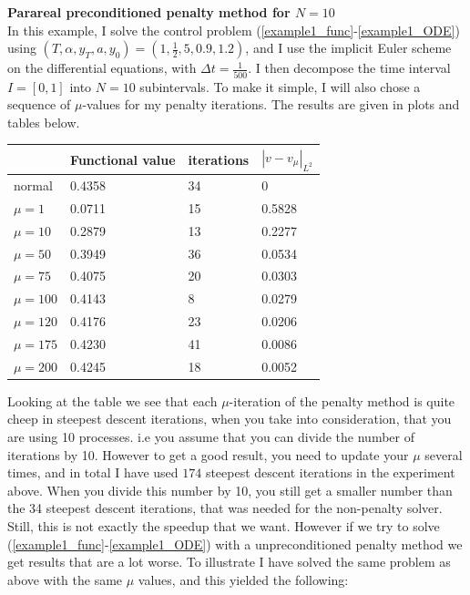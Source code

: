 \documentclass[11pt,a4paper]{article}
\begin{document}
\\
\\
\textbf{Parareal preconditioned penalty method for $N=10$}
\\
In this example, I solve the control problem (\ref{example1_func}-\ref{example1_ODE}) using $(T,\alpha,y_T,a,y_0)=(1,\frac{1}{2},5,0.9,1.2)$, and I use the implicit Euler scheme on the differential equations, with $\Delta t=\frac{1}{500}$. I then decompose the time interval $I=[0,1]$ into $N=10$ subintervals. To make it simple, I will also chose a sequence of $\mu$-values for my penalty iterations. The results are given in plots and tables below. 
 \begin{center}
    \begin{tabular}{| l | l | l | l |}
    \hline
     & Functional value &iterations  & $|v-v_{\mu}|_{L^2}$   \\ \hline
    normal &0.4358 & 34& 0 	\\ \hline
    $\mu=1$ & 0.0711& 15&0.5828 	\\ \hline
    $\mu=10$ &0.2879 &13& 0.2277	\\ \hline
    $\mu=50$ &0.3949&36& 0.0534	\\ \hline
    $\mu=75$ &0.4075&20&0.0303\\ \hline
    $\mu=100$ &0.4143&8&	0.0279\\ \hline
    $\mu=120$ &0.4176&23&0.0206\\ \hline
    $\mu=175$ &0.4230&41&0.0086\\ \hline
    $\mu=200$ &0.4245&18&0.0052\\ \hline
    \end{tabular}
\end{center}
Looking at the table we see that each $\mu$-iteration of the penalty method is quite cheep in steepest descent iterations, when you take into consideration, that you are using 10 processes. i.e you assume that you can divide the number of iterations by 10. However to get a good result, you need to update your $\mu$ several times, and in total I have used $174$ steepest descent iterations in the experiment above. When you divide this number by 10, you still get a smaller number than the 34 steepest descent iterations, that was needed for the non-penalty solver. Still, this is not exactly the speedup that we want. However if we try to solve (\ref{example1_func}-\ref{example1_ODE}) with a unpreconditioned penalty method we get results that are a lot worse. To illustrate I have solved the same problem as above with the same $\mu$ values, and this yielded the following:
\end{document}
